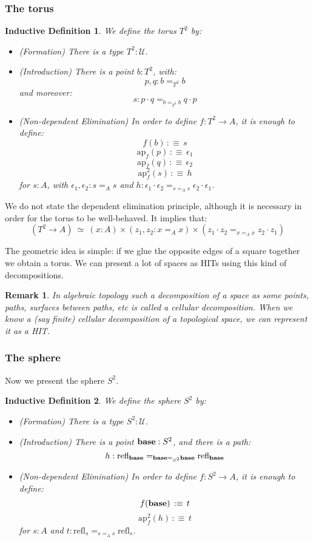 \documentclass{article}
\newcommand{\ssse}[1]{\subsubsection*{#1}}
\newcommand{\U}{{\mathcal U}}
\renewcommand{\r}{\rightarrow}
\newcommand{\ap}{\mathrm{ap}}
\newcommand{\refl}{\mathrm{refl}}
\newcommand{\base}{\mathrm{\bf base}}
\newtheorem{remark}{Remark}
\newtheorem{ind_def}{Inductive Definition}
\begin{document}

\ssse{The torus}

\begin{ind_def}
We define the torus $T^2$ by:
\begin{itemize}
\item (Formation) There is a type $T^2:\U$.
\item (Introduction) There is a point $b:T^2$, with:
\[p,q:b=_{T^2}b\] 
and moreover: 
\[s:p\cdot q =_{b=_{T^2}b} q\cdot p\]
\item (Non-dependent Elimination) In order to define $f:T^2\r A$, it is enough to define:
\[f(b) \, :\equiv\, s\]
\[\ap_f(p) \, :\equiv\, \epsilon_1 \]
\[\ap_f(q) \, :\equiv\, \epsilon_2\]
\[\ap^2_f(s) \, :\equiv\, h\]
for $s:A$, with $\epsilon_1,\epsilon_2 : s=_As$ and $h:\epsilon_1\cdot\epsilon_2 =_{s=_As}\epsilon_2\cdot\epsilon_1$.
\end{itemize}
\end{ind_def}

We do not state the dependent elimination principle, although it is necessary in order for the torus to be well-behaved. It implies that:
\[(T^2\r A) \ \simeq \ (x:A)\times(z_1,z_2:x=_Ax)\times (z_1\cdot z_2 =_{x=_Ax} z_2\cdot z_1)\]

The geometric idea is simple: if we glue the opposite edges of a square together we obtain a torus. We can present a lot of spaces as HITs using this kind of decompositions.

\begin{remark}
In algebraic topology such a decomposition of a space as some points, paths, surfaces between paths, etc is called a cellular decomposition. When we know a (say finite) cellular decomposition of a topological space, we can represent it as a HIT.
\end{remark}

\ssse{The sphere}

Now we present the sphere $S^2$.

\begin{ind_def}
We define the sphere $S^2$ by:
\begin{itemize}
\item (Formation) There is a type $S^2:\U$.
\item (Introduction) There is a point $\base:S^2$, and there is a path:
\[h:\refl_\base =_{\base=_{S^2}\base}\refl_\base\]
\item (Non-dependent Elimination) In order to define $f:S^2\r A$, it is enough to define:
\[f(\base)\, :\equiv\, t\]
\[\ap^2_f(h) \, :\equiv\, t\]
for $s:A$ and $t:\refl_s=_{s=_As}\refl_s$.
\end{itemize}
\end{ind_def}
\end{document}
